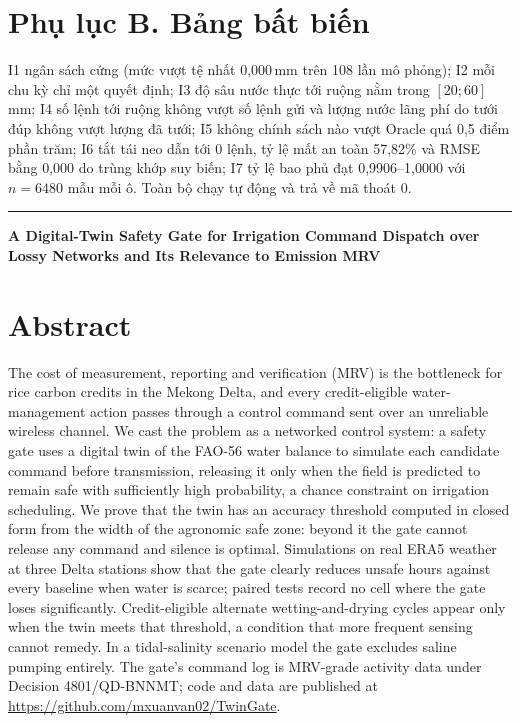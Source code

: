 \documentclass[10pt]{article}
\begin{document}
\section*{Phụ lục B. Bảng bất biến}
I1 ngân sách cứng (mức vượt tệ nhất 0,000\,mm trên 108 lần mô phỏng); I2 mỗi chu kỳ chỉ một quyết định; I3 độ sâu nước thực tới ruộng nằm trong $[20;60]$\,mm; I4 số lệnh tới ruộng không vượt số lệnh gửi và lượng nước lãng phí do tưới đúp không vượt lượng đã tưới; I5 không chính sách nào vượt Oracle quá 0,5 điểm phần trăm; I6 tắt tái neo dẫn tới 0 lệnh, tỷ lệ mất an toàn 57,82\% và RMSE bằng 0,000 do trùng khớp suy biến; I7 tỷ lệ bao phủ đạt 0,9906--1,0000 với $n{=}6480$ mẫu mỗi ô. Toàn bộ chạy tự động và trả về mã thoát 0.

\vspace{1em}
\hrule
\vspace{0.5em}

{\centering\bfseries A Digital-Twin Safety Gate for Irrigation Command Dispatch over Lossy Networks and Its Relevance to Emission MRV\par}
\vspace{0.8em}

\section*{Abstract}

The cost of measurement, reporting and verification (MRV) is the bottleneck for rice carbon credits in the Mekong Delta, and every credit-eligible water-management action passes through a control command sent over an unreliable wireless channel. We cast the problem as a networked control system: a safety gate uses a digital twin of the FAO-56 water balance to simulate each candidate command before transmission, releasing it only when the field is predicted to remain safe with sufficiently high probability, a chance constraint on irrigation scheduling. We prove that the twin has an accuracy threshold computed in closed form from the width of the agronomic safe zone: beyond it the gate cannot release any command and silence is optimal. Simulations on real ERA5 weather at three Delta stations show that the gate clearly reduces unsafe hours against every baseline when water is scarce; paired tests record no cell where the gate loses significantly. Credit-eligible alternate wetting-and-drying cycles appear only when the twin meets that threshold, a condition that more frequent sensing cannot remedy. In a tidal-salinity scenario model the gate excludes saline pumping entirely. The gate's command log is MRV-grade activity data under Decision 4801/QD-BNNMT; code and data are published at \url{https://github.com/mxuanvan02/TwinGate}.
\end{document}

